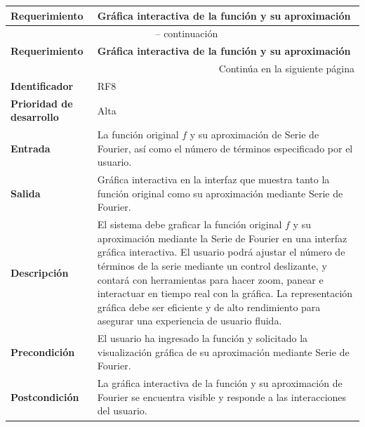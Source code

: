 \begin{longtable}{|m{3.5cm}|m{9.5cm}|}
	\hline
	\rowcolor{black!75} \color{white}\textbf{Requerimiento} & \color{white}\textbf{Gráfica interactiva de la función y su aproximación} \\
	\hline
	\endfirsthead
	\multicolumn{2}{c}{{\tablename\ \thetable{} -- continuación}} \\
	\hline
	\rowcolor{black!75} \color{white}\textbf{Requerimiento} & \color{white}\textbf{Gráfica interactiva de la función y su aproximación} \\
	\hline
	\endhead
	\hline \multicolumn{2}{r}{{Continúa en la siguiente página}} \\
	\endfoot
	\hline
	\endlastfoot
	
	\textbf{Identificador} & RF8 \\
	\hline
	\textbf{Prioridad de desarrollo} & Alta \\
	\hline
	\textbf{Entrada} & La función original \( f \) y su aproximación de Serie de Fourier, así como el número de términos especificado por el usuario. \\
	\hline
	\textbf{Salida} & Gráfica interactiva en la interfaz que muestra tanto la función original como su aproximación mediante Serie de Fourier. \\
	\hline
	\textbf{Descripción} & El sistema debe graficar la función original \( f \) y su aproximación mediante la Serie de Fourier en una interfaz gráfica interactiva. El usuario podrá ajustar el número de términos de la serie mediante un control deslizante, y contará con herramientas para hacer zoom, panear e interactuar en tiempo real con la gráfica. La representación gráfica debe ser eficiente y de alto rendimiento para asegurar una experiencia de usuario fluida. \\
	\hline
	\textbf{Precondición} & El usuario ha ingresado la función y solicitado la visualización gráfica de su aproximación mediante Serie de Fourier. \\
	\hline
	\textbf{Postcondición} & La gráfica interactiva de la función y su aproximación de Fourier se encuentra visible y responde a las interacciones del usuario. \\
	\hline
\end{longtable}
\caption{Requerimiento funcional No. 8} \label{tabla:RF8}
\vspace{0.5cm}

